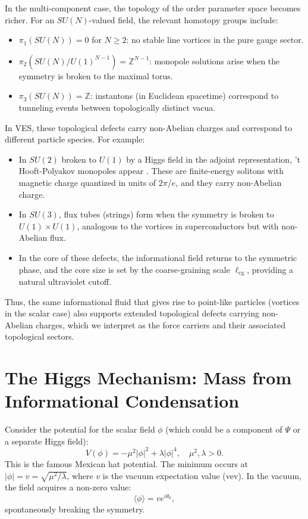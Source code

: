 \documentclass[12pt,a4paper]{book}
\begin{document}
In the multi-component case, the topology of the order parameter space becomes richer. For an $SU(N)$-valued field, the relevant homotopy groups include:
\begin{itemize}
    \item $\pi_1(SU(N)) = 0$ for $N \geq 2$: no stable line vortices in the pure gauge sector.
    \item $\pi_2(SU(N)/U(1)^{N-1}) = \mathbb{Z}^{N-1}$: monopole solutions arise when the symmetry is broken to the maximal torus.
    \item $\pi_3(SU(N)) = \mathbb{Z}$: instantons (in Euclidean spacetime) correspond to tunneling events between topologically distinct vacua.
\end{itemize}
In VES, these topological defects carry non-Abelian charges and correspond to different particle species. For example:
\begin{itemize}
    \item In $SU(2)$ broken to $U(1)$ by a Higgs field in the adjoint representation, 't Hooft-Polyakov monopoles appear \cite{thooft1974, polyakov1974}. These are finite-energy solitons with magnetic charge quantized in units of $2\pi/e$, and they carry non-Abelian charge.
    \item In $SU(3)$, flux tubes (strings) form when the symmetry is broken to $U(1) \times U(1)$, analogous to the vortices in superconductors but with non-Abelian flux.
    \item In the core of these defects, the informational field returns to the symmetric phase, and the core size is set by the coarse-graining scale $\ell_{\text{cg}}$, providing a natural ultraviolet cutoff.
\end{itemize}
Thus, the same informational fluid that gives rise to point-like particles (vortices in the scalar case) also supports extended topological defects carrying non-Abelian charges, which we interpret as the force carriers and their associated topological sectors.

\section{The Higgs Mechanism: Mass from Informational Condensation}

Consider the potential for the scalar field $\phi$ (which could be a component of $\Psi$ or a separate Higgs field):
\begin{equation}
    V(\phi) = -\mu^2 |\phi|^2 + \lambda |\phi|^4, \quad \mu^2, \lambda > 0.
\end{equation}
This is the famous Mexican hat potential. The minimum occurs at $|\phi| = v = \sqrt{\mu^2/\lambda}$, where $v$ is the vacuum expectation value (vev). In the vacuum, the field acquires a non-zero value:
\begin{equation}
    \langle \phi \rangle = v e^{i\theta_0},
\end{equation}
spontaneously breaking the symmetry.
\end{document}
